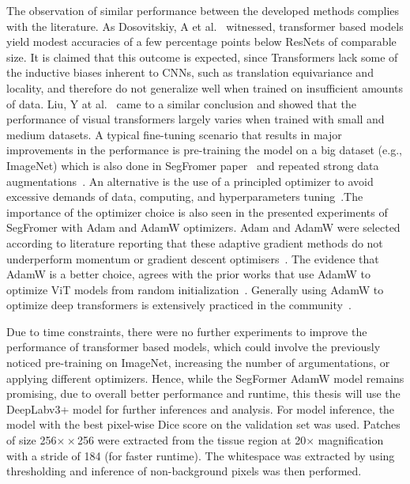 The observation of similar performance between the developed methods complies with the literature. 
As Dosovitskiy, A et al.~\cite*{dosovitskiy2020image} witnessed, transformer based models yield
modest accuracies of a few percentage points below ResNets of comparable size. It is claimed
that this outcome is expected, since Transformers lack some of the inductive biases
inherent to CNNs, such as translation equivariance and locality, and therefore do not generalize
well when trained on insufficient amounts of data. Liu, Y at al.~\cite{liu2021efficient} came to
a similar conclusion and showed that the performance of visual transformers largely varies when
trained with small and medium datasets. A typical fine-tuning scenario that results in major
improvements in the performance is pre-training the model on a big dataset (e.g., ImageNet) which
is also done in SegFromer paper~\cite*{xie2021segformer} and repeated strong data augmentations~\cite{touvron2021training}.
An alternative is the use of a principled optimizer to avoid excessive demands of data,
computing, and hyperparameters tuning~\cite*{chen2021vision}.The importance of the optimizer
choice is also seen in the presented experiments of SegFromer with Adam and AdamW optimizers.
Adam and AdamW were selected according to literature reporting that these adaptive gradient
methods do not underperform momentum or gradient descent optimisers~\cite{choi2019empirical}.
The evidence that AdamW is a better choice, agrees with the prior works that use AdamW to
optimize ViT models from random initialization~\cite{xiao2021early}. Generally using AdamW
to optimize deep transformers is extensively practiced in the community~\cite{anonymous2023applying}.

Due to time constraints, there were no further experiments to improve the performance of transformer
based models, which could involve the previously noticed pre-training on ImageNet, increasing
the number of argumentations, or applying different optimizers.
Hence, while the SegFormer AdamW model remains promising, due to overall better performance and
runtime, this thesis will use the DeepLabv3+ model for further inferences and analysis.
For model inference, the model with the best pixel-wise Dice score on the validation set was used.
Patches of size 256$×\times$256 were extracted from the tissue region at 20$\times$ magnification
with a stride of 184 (for faster runtime). The whitespace was extracted by using thresholding and
inference of non-background pixels was then performed.

